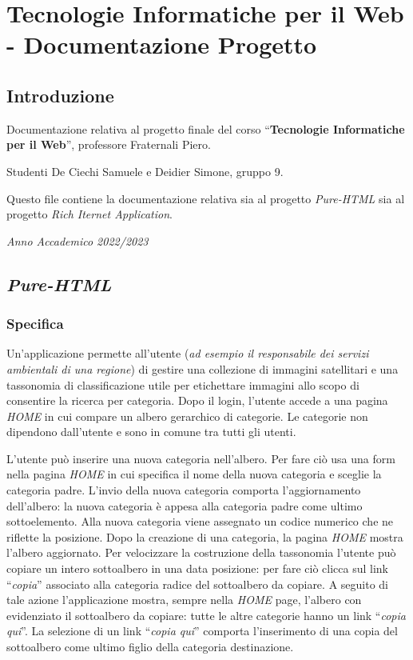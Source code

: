 \hypertarget{tecnologie-informatiche-per-il-web---documentazione-progetto}{%
\section{Tecnologie Informatiche per il Web - Documentazione
Progetto}\label{tecnologie-informatiche-per-il-web---documentazione-progetto}}

\hypertarget{introduzione}{%
\subsection{Introduzione}\label{introduzione}}

Documentazione relativa al progetto finale del corso
``\textbf{Tecnologie Informatiche per il Web}'', professore Fraternali
Piero.

Studenti De Ciechi Samuele e Deidier Simone, gruppo 9.

Questo file contiene la documentazione relativa sia al progetto
\emph{Pure-HTML} sia al progetto \emph{Rich Iternet Application}.

\emph{Anno Accademico 2022/2023}

\hypertarget{pure-html}{%
\subsection{\texorpdfstring{\emph{Pure-HTML}}{Pure-HTML}}\label{pure-html}}

\hypertarget{specifica}{%
\subsubsection{Specifica}\label{specifica}}

Un'applicazione permette all'utente (\emph{ad esempio il responsabile
dei servizi ambientali di una regione}) di gestire una collezione di
immagini satellitari e una tassonomia di classificazione utile per
etichettare immagini allo scopo di consentire la ricerca per categoria.
Dopo il login, l'utente accede a una pagina \emph{HOME} in cui compare
un albero gerarchico di categorie. Le categorie non dipendono
dall'utente e sono in comune tra tutti gli utenti.

L'utente può inserire una nuova categoria nell'albero. Per fare ciò usa
una form nella pagina \emph{HOME} in cui specifica il nome della nuova
categoria e sceglie la categoria padre. L'invio della nuova categoria
comporta l'aggiornamento dell'albero: la nuova categoria è appesa alla
categoria padre come ultimo sottoelemento. Alla nuova categoria viene
assegnato un codice numerico che ne riflette la posizione. Dopo la
creazione di una categoria, la pagina \emph{HOME} mostra l'albero
aggiornato. Per velocizzare la costruzione della tassonomia l'utente può
copiare un intero sottoalbero in una data posizione: per fare ciò clicca
sul link ``\emph{copia}'' associato alla categoria radice del
sottoalbero da copiare. A seguito di tale azione l'applicazione mostra,
sempre nella \emph{HOME} page, l'albero con evidenziato il sottoalbero
da copiare: tutte le altre categorie hanno un link ``\emph{copia qui}''.
La selezione di un link ``\emph{copia qui}'' comporta l'inserimento di
una copia del sottoalbero come ultimo figlio della categoria
destinazione.

